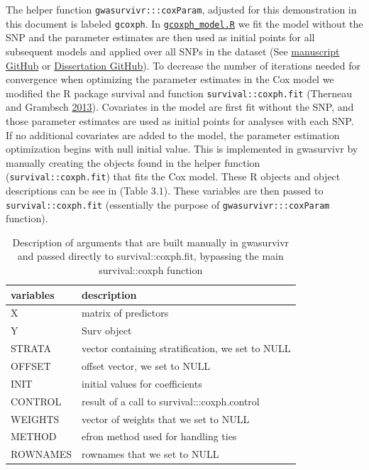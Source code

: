 \documentclass[]{DissertateOSU}
\begin{document}
The helper function \texttt{gwasurvivr:::coxParam}, adjusted for this
demonstration in this document is labeled \texttt{gcoxph}. In
\href{https://github.com/suchestoncampbelllab/gwasurvivr_manuscript/blob/master/supplemental_data/code/gcoxph_model.R}{\texttt{gcoxph\_model.R}}
we fit the model without the SNP and the parameter estimates are then
used as initial points for all subsequent models and applied over all
SNPs in the dataset (See
\href{https://github.com/suchestoncampbelllab/gwasurvivr_manuscript}{manuscript
GitHub} or
\href{https://github.com/aarizvi/dissertation/tree/master/code/chapter3}{Dissertation
GitHub}). To decrease the number of iterations needed for convergence
when optimizing the parameter estimates in the Cox model we modified the
R package survival and function \texttt{survival::coxph.fit} (Therneau
and Grambsch \protect\hyperlink{ref-therneau2013}{2013}). Covariates in
the model are first fit without the SNP, and those parameter estimates
are used as initial points for analyses with each SNP. If no additional
covariates are added to the model, the parameter estimation optimization
begins with null initial value. This is implemented in gwasurvivr by
manually creating the objects found in the helper function
(\texttt{survival::coxph.fit}) that fits the Cox model. These R objects
and object descriptions can be see in (Table 3.1). These variables are
then passed to \texttt{survival::coxph.fit} (essentially the purpose of
\texttt{gwasurvivr:::coxParam} function).

\begin{table}[t]

\caption{\label{tab:unnamed-chunk-27}Description of arguments that are built manually in gwasurvivr and passed directly to survival::coxph.fit, bypassing the main survival::coxph function}
\centering
\fontsize{9}{11}\selectfont
\begin{tabular}{ll}
\toprule
variables & description\\
\midrule
X & matrix of predictors\\
Y & Surv object\\
STRATA & vector containing stratification, we set to NULL\\
OFFSET & offset vector, we set to NULL\\
INIT & initial values for coefficients\\
\addlinespace
CONTROL & result of a call to survival:::coxph.control\\
WEIGHTS & vector of weights that we set to NULL\\
METHOD & efron method used for handling ties\\
ROWNAMES & rownames that we set to NULL\\
\bottomrule
\end{tabular}
\end{table}
\end{document}
